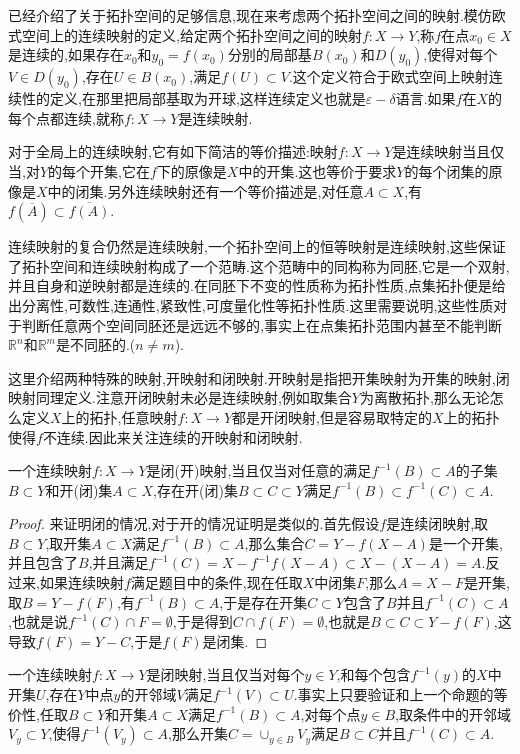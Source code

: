 已经介绍了关于拓扑空间的足够信息,现在来考虑两个拓扑空间之间的映射.模仿欧式空间上的连续映射的定义,给定两个拓扑空间之间的映射$f:X\to Y$,称$f$在点$x_0\in X$是连续的,如果存在$x_0$和$y_0=f(x_0)$分别的局部基$B(x_0)$和$D(y_0)$,使得对每个$V\in D(y_0)$,存在$U\in B(x_0)$,满足$f(U)\subset V$.这个定义符合于欧式空间上映射连续性的定义,在那里把局部基取为开球,这样连续定义也就是$\varepsilon-\delta$语言.如果$f$在$X$的每个点都连续,就称$f:X\to Y$是连续映射.

对于全局上的连续映射,它有如下简洁的等价描述:映射$f:X\to Y$是连续映射当且仅当,对$Y$的每个开集,它在$f$下的原像是$X$中的开集.这也等价于要求$Y$的每个闭集的原像是$X$中的闭集.另外连续映射还有一个等价描述是,对任意$A\subset X$,有$f(\overline{A})\subset\overline{f(A)}$.

连续映射的复合仍然是连续映射,一个拓扑空间上的恒等映射是连续映射,这些保证了拓扑空间和连续映射构成了一个范畴.这个范畴中的同构称为同胚,它是一个双射,并且自身和逆映射都是连续的.在同胚下不变的性质称为拓扑性质,点集拓扑便是给出分离性,可数性,连通性,紧致性,可度量化性等拓扑性质.这里需要说明,这些性质对于判断任意两个空间同胚还是远远不够的,事实上在点集拓扑范围内甚至不能判断$\mathbb{R}^n$和$\mathbb{R}^m$是不同胚的.($n\not=m$).

这里介绍两种特殊的映射,开映射和闭映射.开映射是指把开集映射为开集的映射,闭映射同理定义.注意开闭映射未必是连续映射,例如取集合$Y$为离散拓扑,那么无论怎么定义$X$上的拓扑,任意映射$f:X\to Y$都是开闭映射,但是容易取特定的$X$上的拓扑使得$f$不连续.因此来关注连续的开映射和闭映射.

一个连续映射$f:X\to Y$是闭(开)映射,当且仅当对任意的满足$f^{-1}(B)\subset A$的子集$B\subset Y$和开(闭)集$A\subset X$,存在开(闭)集$B\subset C\subset Y$满足$f^{-1}(B)\subset f^{-1}(C)\subset A$.
\begin{proof}
	
	来证明闭的情况,对于开的情况证明是类似的.首先假设$f$是连续闭映射,取$B\subset Y$,取开集$A\subset X$满足$f^{-1}(B)\subset A$,那么集合$C=Y-f(X-A)$是一个开集,并且包含了$B$,并且满足$f^{-1}(C)=X-f^{-1}f(X-A)\subset X-(X-A)=A$.反过来,如果连续映射$f$满足题目中的条件,现在任取$X$中闭集$F$,那么$A=X-F$是开集,取$B=Y-f(F)$,有$f^{-1}(B)\subset A$,于是存在开集$C\subset Y$包含了$B$并且$f^{-1}(C)\subset A$,也就是说$f^{-1}(C)\cap F=\emptyset$,于是得到$C\cap f(F)=\emptyset$,也就是$B\subset C\subset Y-f(F)$,这导致$f(F)=Y-C$,于是$f(F)$是闭集.
\end{proof}

一个连续映射$f:X\to Y$是闭映射,当且仅当对每个$y\in Y$,和每个包含$f^{-1}(y)$的$X$中开集$U$,存在$Y$中点$y$的开邻域$V$满足$f^{-1}(V)\subset U$.事实上只要验证和上一个命题的等价性,任取$B\subset Y$和开集$A\subset X$满足$f^{-1}(B)\subset A$,对每个点$y\in B$,取条件中的开邻域$V_y\subset Y$,使得$f^{-1}(V_y)\subset A$,那么开集$C=\cup_{y\in B}V_y$满足$B\subset C$并且$f^{-1}(C)\subset A$.


